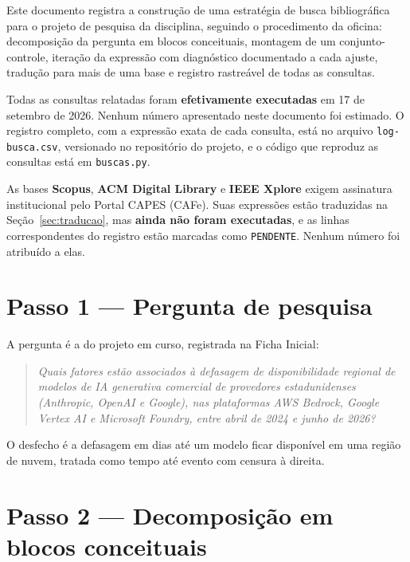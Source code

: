 \documentclass[12pt,a4paper]{article}
\begin{document}
Este documento registra a construção de uma estratégia de busca bibliográfica para o
projeto de pesquisa da disciplina, seguindo o procedimento da oficina: decomposição da
pergunta em blocos conceituais, montagem de um conjunto-controle, iteração da expressão
com diagnóstico documentado a cada ajuste, tradução para mais de uma base e registro
rastreável de todas as consultas.

Todas as consultas relatadas foram \textbf{efetivamente executadas} em 17 de setembro de
2026. Nenhum número apresentado neste documento foi estimado. O registro completo, com a
expressão exata de cada consulta, está no arquivo \texttt{log-busca.csv}, versionado no
repositório do projeto, e o código que reproduz as consultas está em \texttt{buscas.py}.

\begin{tcolorbox}[colback=yellow!8,colframe=yellow!55!black,title=\textbf{Consultas ainda não executadas}]
As bases \textbf{Scopus}, \textbf{ACM Digital Library} e \textbf{IEEE Xplore} exigem
assinatura institucional pelo Portal CAPES (CAFe). Suas expressões estão traduzidas na
Seção~\ref{sec:traducao}, mas \textbf{ainda não foram executadas}, e as linhas
correspondentes do registro estão marcadas como \texttt{PENDENTE}. Nenhum número foi
atribuído a elas.
\end{tcolorbox}

\section{Passo 1 --- Pergunta de pesquisa}

A pergunta é a do projeto em curso, registrada na Ficha Inicial:

\begin{quote}
\itshape
Quais fatores estão associados à defasagem de disponibilidade regional de modelos de IA
generativa comercial de provedores estadunidenses (Anthropic, OpenAI e Google), nas
plataformas AWS Bedrock, Google Vertex AI e Microsoft Foundry, entre abril de 2024 e
junho de 2026?
\end{quote}

O desfecho é a defasagem em dias até um modelo ficar disponível em uma região de nuvem,
tratada como tempo até evento com censura à direita.

\section{Passo 2 --- Decomposição em blocos conceituais}
\end{document}
